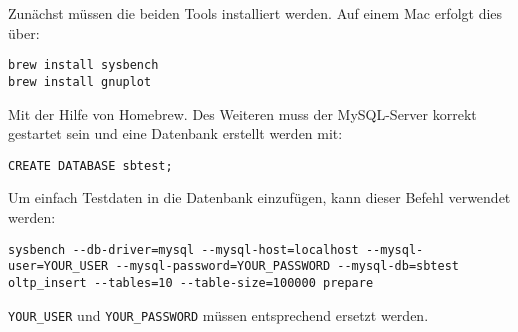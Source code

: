 Zunächst müssen die beiden Tools installiert werden.
Auf einem Mac erfolgt dies über:

\begin{lstlisting}[label={lst:install tools}]
brew install sysbench
brew install gnuplot
\end{lstlisting}

Mit der Hilfe von Homebrew.
Des Weiteren muss der MySQL-Server korrekt gestartet sein und eine Datenbank erstellt werden mit:

\begin{lstlisting}[label={lst:create databse}]
CREATE DATABASE sbtest;
\end{lstlisting}

Um einfach Testdaten in die Datenbank einzufügen, kann dieser Befehl verwendet werden:

\begin{lstlisting}[style=custom_daniel,label={lst:sysbenchrun}]
sysbench --db-driver=mysql --mysql-host=localhost --mysql-user=YOUR_USER --mysql-password=YOUR_PASSWORD --mysql-db=sbtest oltp_insert --tables=10 --table-size=100000 prepare
\end{lstlisting}

\texttt{YOUR\_USER} und \texttt{YOUR\_PASSWORD} müssen entsprechend ersetzt werden.



